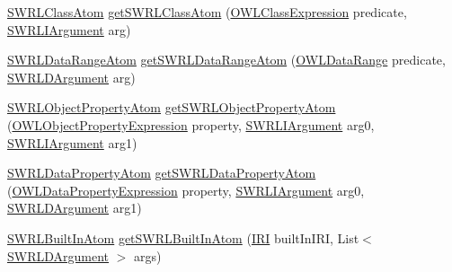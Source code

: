 \begin{DoxyCompactItemize}
\item 
\hyperlink{interfaceorg_1_1semanticweb_1_1owlapi_1_1model_1_1_s_w_r_l_class_atom}{S\-W\-R\-L\-Class\-Atom} \hyperlink{interfaceorg_1_1semanticweb_1_1owlapi_1_1model_1_1_s_w_r_l_data_factory_a03a09ba20470f4ff5dff3712b99d7e40}{get\-S\-W\-R\-L\-Class\-Atom} (\hyperlink{interfaceorg_1_1semanticweb_1_1owlapi_1_1model_1_1_o_w_l_class_expression}{O\-W\-L\-Class\-Expression} predicate, \hyperlink{interfaceorg_1_1semanticweb_1_1owlapi_1_1model_1_1_s_w_r_l_i_argument}{S\-W\-R\-L\-I\-Argument} arg)
\item 
\hyperlink{interfaceorg_1_1semanticweb_1_1owlapi_1_1model_1_1_s_w_r_l_data_range_atom}{S\-W\-R\-L\-Data\-Range\-Atom} \hyperlink{interfaceorg_1_1semanticweb_1_1owlapi_1_1model_1_1_s_w_r_l_data_factory_a655eefc50a60dbcb01a3abe2e07b1387}{get\-S\-W\-R\-L\-Data\-Range\-Atom} (\hyperlink{interfaceorg_1_1semanticweb_1_1owlapi_1_1model_1_1_o_w_l_data_range}{O\-W\-L\-Data\-Range} predicate, \hyperlink{interfaceorg_1_1semanticweb_1_1owlapi_1_1model_1_1_s_w_r_l_d_argument}{S\-W\-R\-L\-D\-Argument} arg)
\item 
\hyperlink{interfaceorg_1_1semanticweb_1_1owlapi_1_1model_1_1_s_w_r_l_object_property_atom}{S\-W\-R\-L\-Object\-Property\-Atom} \hyperlink{interfaceorg_1_1semanticweb_1_1owlapi_1_1model_1_1_s_w_r_l_data_factory_aa0bcbbee5e3982ecafc3d5344ab327d9}{get\-S\-W\-R\-L\-Object\-Property\-Atom} (\hyperlink{interfaceorg_1_1semanticweb_1_1owlapi_1_1model_1_1_o_w_l_object_property_expression}{O\-W\-L\-Object\-Property\-Expression} property, \hyperlink{interfaceorg_1_1semanticweb_1_1owlapi_1_1model_1_1_s_w_r_l_i_argument}{S\-W\-R\-L\-I\-Argument} arg0, \hyperlink{interfaceorg_1_1semanticweb_1_1owlapi_1_1model_1_1_s_w_r_l_i_argument}{S\-W\-R\-L\-I\-Argument} arg1)
\item 
\hyperlink{interfaceorg_1_1semanticweb_1_1owlapi_1_1model_1_1_s_w_r_l_data_property_atom}{S\-W\-R\-L\-Data\-Property\-Atom} \hyperlink{interfaceorg_1_1semanticweb_1_1owlapi_1_1model_1_1_s_w_r_l_data_factory_ad382834d4a38364b65ac8252bdb32167}{get\-S\-W\-R\-L\-Data\-Property\-Atom} (\hyperlink{interfaceorg_1_1semanticweb_1_1owlapi_1_1model_1_1_o_w_l_data_property_expression}{O\-W\-L\-Data\-Property\-Expression} property, \hyperlink{interfaceorg_1_1semanticweb_1_1owlapi_1_1model_1_1_s_w_r_l_i_argument}{S\-W\-R\-L\-I\-Argument} arg0, \hyperlink{interfaceorg_1_1semanticweb_1_1owlapi_1_1model_1_1_s_w_r_l_d_argument}{S\-W\-R\-L\-D\-Argument} arg1)
\item 
\hyperlink{interfaceorg_1_1semanticweb_1_1owlapi_1_1model_1_1_s_w_r_l_built_in_atom}{S\-W\-R\-L\-Built\-In\-Atom} \hyperlink{interfaceorg_1_1semanticweb_1_1owlapi_1_1model_1_1_s_w_r_l_data_factory_aae02b6a4f955de5cc5200f5ed14339e4}{get\-S\-W\-R\-L\-Built\-In\-Atom} (\hyperlink{classorg_1_1semanticweb_1_1owlapi_1_1model_1_1_i_r_i}{I\-R\-I} built\-In\-I\-R\-I, List$<$ \hyperlink{interfaceorg_1_1semanticweb_1_1owlapi_1_1model_1_1_s_w_r_l_d_argument}{S\-W\-R\-L\-D\-Argument} $>$ args)

\end{DoxyCompactItemize}
